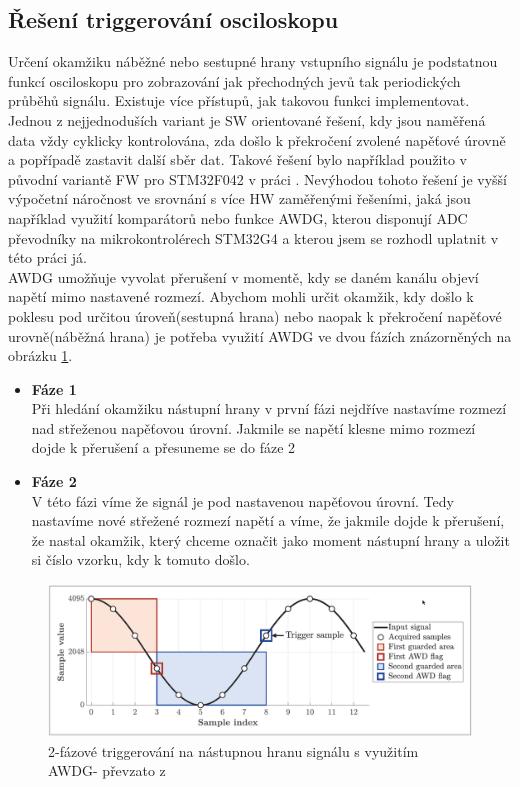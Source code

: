 \subsection{Řešení triggerování osciloskopu}
Určení okamžiku náběžné nebo sestupné hrany vstupního signálu je podstatnou funkcí osciloskopu pro zobrazování jak přechodných jevů tak periodických průběhů signálu. Existuje více přístupů, jak takovou funkci implementovat. Jednou z nejjednoduších variant je SW orientované řešení, kdy  jsou naměřená data vždy cyklicky kontrolována, zda došlo k překročení zvolené napěťové úrovně a popřípadě zastavit další sběr dat. Takové řešení bylo například použito v původní variantě FW pro STM32F042 v práci \cite{BerlingerDIP}. Nevýhodou tohoto řešení je vyšší výpočetní náročnost ve srovnání s více HW zaměřenými řešeními, jaká jsou například využití komparátorů nebo funkce AWDG, kterou disponují ADC převodníky na mikrokontrolérech STM32G4 a kterou jsem se rozhodl uplatnit v této práci já.\\

AWDG umožňuje vyvolat přerušení v momentě, kdy se daném kanálu objeví napětí mimo nastavené rozmezí. Abychom mohli určit okamžik, kdy došlo k poklesu pod určitou úroveň(sestupná hrana) nebo naopak k překročení napěťové urovně(náběžná hrana) je potřeba využití AWDG ve dvou fázích znázorněných na obrázku \ref{fig:awdgtrigger}.

\begin{itemize}
	\item \textbf{Fáze 1}\\
	Při hledání okamžiku nástupní hrany v první fázi nejdříve nastavíme rozmezí nad střeženou napěťovou úrovní. Jakmile se napětí klesne mimo rozmezí dojde k přerušení a přesuneme se do fáze 2 
	\item \textbf{Fáze 2}\\
	V této fázi víme že signál je pod nastavenou napěťovou úrovní. Tedy nastavíme nové střežené rozmezí napětí a víme, že jakmile dojde k přerušení, že nastal okamžik, který chceme označit jako moment nástupní hrany a uložit si číslo vzorku, kdy k tomuto došlo.
\end{itemize}
\begin{figure}
	\centering
	\includegraphics[width=1\linewidth]{Figs/Graphs/AWDG_Trigger}
	\caption{2-fázové triggerování na nástupnou hranu signálu s využitím AWDG- převzato z \cite{DujavaDIP}}
	\label{fig:awdgtrigger}
\end{figure}

